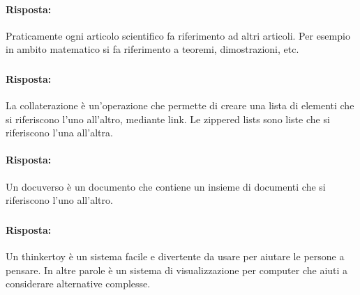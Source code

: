 
\paragraph{Risposta:} Praticamente ogni articolo scientifico fa riferimento ad altri articoli. Per esempio in ambito matematico 
si fa riferimento a teoremi, dimostrazioni, etc.

\subsubsection{}


\paragraph{Risposta:} La collaterazione è un'operazione che permette di creare una lista di elementi che si riferiscono l'uno all'altro, mediante link.
Le zippered lists sono liste che si riferiscono l'una all'altra.


\paragraph{Risposta:} Un docuverso è un documento che contiene un insieme di documenti che si riferiscono l'uno all'altro.

\subsubsection{}


\paragraph{Risposta:} Un thinkertoy è un sistema facile e divertente da usare per aiutare le persone a pensare.
In altre parole è un sistema di visualizzazione
per computer che aiuti a considerare alternative complesse.

\subsubsection{}

